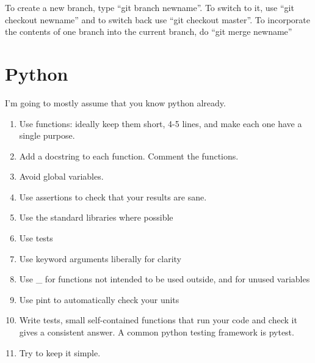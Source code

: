 \documentclass[12pt]{article}
\begin{document}
To create a new branch, type ``git branch newname''. To switch to it, use ``git checkout newname'' and to switch back use ``git checkout master''. To incorporate the contents of one branch into the current branch, do ``git merge newname''

\section{Python}

I'm going to mostly assume that you know python already.

\begin{enumerate}
 \item Use functions: ideally keep them short, 4-5 lines, and make each one have a single purpose.
 \item Add a docstring to each function. Comment the functions.
 \item Avoid global variables.
 \item Use assertions to check that your results are sane.
 \item Use the standard libraries where possible
 \item Use tests
 \item Use keyword arguments liberally for clarity
 \item Use \_ for functions not intended to be used outside, and for unused variables
 \item Use pint to automatically check your units
 \item Write tests, small self-contained functions that run your code and check it gives a consistent answer. A common python testing framework is pytest.
 \item Try to keep it simple.
\end{enumerate}
\end{document}
